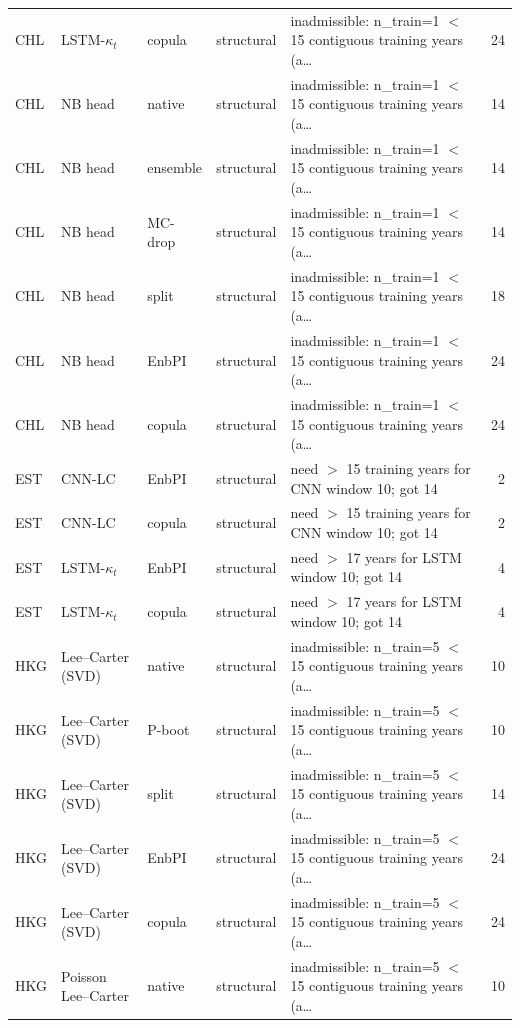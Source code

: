{\begin{longtable}{@{}lllp{1.6cm}p{6.2cm}r@{}}
CHL & LSTM-$\kappa_t$ & copula & structural & inadmissible: n\_train=1 $<$ 15 contiguous training years (a\ldots & 24 \\
CHL & NB head & native & structural & inadmissible: n\_train=1 $<$ 15 contiguous training years (a\ldots & 14 \\
CHL & NB head & ensemble & structural & inadmissible: n\_train=1 $<$ 15 contiguous training years (a\ldots & 14 \\
CHL & NB head & MC-drop & structural & inadmissible: n\_train=1 $<$ 15 contiguous training years (a\ldots & 14 \\
CHL & NB head & split & structural & inadmissible: n\_train=1 $<$ 15 contiguous training years (a\ldots & 18 \\
CHL & NB head & EnbPI & structural & inadmissible: n\_train=1 $<$ 15 contiguous training years (a\ldots & 24 \\
CHL & NB head & copula & structural & inadmissible: n\_train=1 $<$ 15 contiguous training years (a\ldots & 24 \\
EST & CNN-LC & EnbPI & structural & need $>$ 15 training years for CNN window 10; got 14 & 2 \\
EST & CNN-LC & copula & structural & need $>$ 15 training years for CNN window 10; got 14 & 2 \\
EST & LSTM-$\kappa_t$ & EnbPI & structural & need $>$ 17 years for LSTM window 10; got 14 & 4 \\
EST & LSTM-$\kappa_t$ & copula & structural & need $>$ 17 years for LSTM window 10; got 14 & 4 \\
HKG & Lee--Carter (SVD) & native & structural & inadmissible: n\_train=5 $<$ 15 contiguous training years (a\ldots & 10 \\
HKG & Lee--Carter (SVD) & P-boot & structural & inadmissible: n\_train=5 $<$ 15 contiguous training years (a\ldots & 10 \\
HKG & Lee--Carter (SVD) & split & structural & inadmissible: n\_train=5 $<$ 15 contiguous training years (a\ldots & 14 \\
HKG & Lee--Carter (SVD) & EnbPI & structural & inadmissible: n\_train=5 $<$ 15 contiguous training years (a\ldots & 24 \\
HKG & Lee--Carter (SVD) & copula & structural & inadmissible: n\_train=5 $<$ 15 contiguous training years (a\ldots & 24 \\
HKG & Poisson Lee--Carter & native & structural & inadmissible: n\_train=5 $<$ 15 contiguous training years (a\ldots & 10 \\

\end{longtable}}

